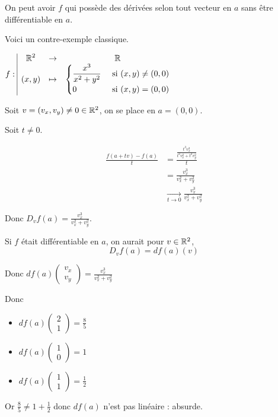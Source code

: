 \begin{proposition}{}{}
    On peut avoir $f$ qui possède des dérivées selon tout vecteur en $a$ sans être 
    différentiable en $a$. 
\end{proposition}

\begin{exemple}
    Voici un contre-exemple classique. 

    $f: \space \begin{array}{|ccc} \displaystyle \mathbb{R}^2 & \to & \displaystyle \mathbb{R} \\ \displaystyle (x, y) & \mapsto & \displaystyle \begin{cases}
        \displaystyle \frac{x^3}{x^2 + y^2} & \text{ si } (x, y) \neq (0, 0) \\
        0 & \text{ si } (x, y) = (0, 0)
    \end{cases} \end{array}$

    Soit $v = (v_x, v_y) \neq 0 \in \mathbb{R}^2$, on se place en $a = (0, 0)$.

    Soit $t \neq 0$. 

    \begin{align}
        \frac{f(a + tv) - f(a)}{t} & = \frac{\frac{t^3 v_x^3}{t^2 v_x^2 + t^2 v_y^2}}{t } \\
        & = \frac{v_x^3}{v_x^2 + v_y^2} \\
        & \xrightarrow[t \to 0 ]{} \frac{v_x^3}{v_x^2 + v_y^2}
    \end{align}

    Donc $D_vf(a) = \frac{v_x^3}{v_x^2 + v_y^2}$.

    Si $f$ était différentiable en $a$, on aurait pour $v \in \mathbb{R}^2$, 
    $$D_v f(a) = df(a)(v) $$

    Donc $\displaystyle df(a)\begin{pmatrix}
        v_x \\
        v_y
    \end{pmatrix} = \frac{v_x^3}{v_x^2 + v_y^2}$

    Donc 
    
    \begin{itemize}
        \item $\displaystyle df(a) \begin{pmatrix}
        2 \\
        1
    \end{pmatrix} = \frac{8}{5}$
        \item $\displaystyle df(a) \begin{pmatrix}
        1 \\
        0
    \end{pmatrix} = 1$
        \item $\displaystyle df(a) \begin{pmatrix}
        1 \\
        1
    \end{pmatrix} = \frac{1}{2}$
    \end{itemize}

    Or $\frac 8 5 \neq 1 + \frac 1 2$ donc $df(a)$ n'est pas linéaire : absurde. 
\end{exemple}

